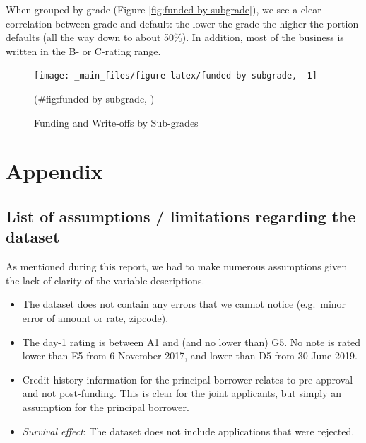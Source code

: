 \documentclass[11pt,]{report}
\begin{document}
\normalsize

When grouped by grade (Figure \ref{fig:funded-by-subgrade}), we see a clear correlation between grade and default: the lower the grade the higher the portion defaults (all the way down to about 50\%). In addition, most of the business is written in the B- or C-rating range.

\small

\begin{figure}

{\centering \texttt{[image: \_main\_files/figure-latex/funded-by-subgrade, -1]} 

}

\caption{Funding and Write-offs by Sub-grades}(\#fig:funded-by-subgrade, )
\end{figure}

\normalsize

\hypertarget{appendix}{%
\chapter*{Appendix}\label{appendix}}

\hypertarget{list-of-assumptions-limitations-regarding-the-dataset}{%
\section{List of assumptions / limitations regarding the dataset}\label{list-of-assumptions-limitations-regarding-the-dataset}}

As mentioned during this report, we had to make numerous assumptions given the lack of clarity of the variable descriptions.

\begin{itemize}
\item
  The dataset does not contain any errors that we cannot notice (e.g.~minor error of amount or rate, zipcode).
\item
  The day-1 rating is between A1 and (and no lower than) G5. No note is rated lower than E5 from 6 November 2017, and lower than D5 from 30 June 2019.
\item
  Credit history information for the principal borrower relates to pre-approval and not post-funding. This is clear for the joint applicants, but simply an assumption for the principal borrower.
\item
  \emph{Survival effect}: The dataset does not include applications that were rejected.
\end{itemize}
\end{document}

